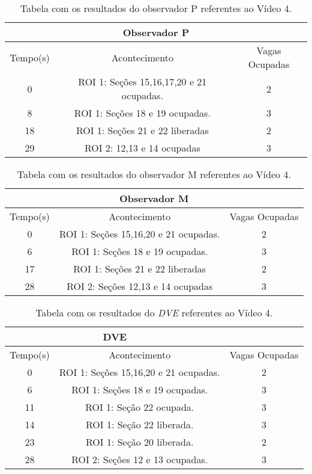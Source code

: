 \begin{table}[H]
\begin{center}
\begin{tabular}{|c||c||c|}
\hline
\multicolumn{3}{|c|}{Observador P}  \\ \hline \hline
Tempo(s) & Acontecimento & Vagas Ocupadas\\ \hline
0 & ROI 1: Seções 15,16,17,20 e 21 ocupadas. & 2 \\ \hline
8 & ROI 1: Seções 18 e 19 ocupadas. & 3 \\ \hline
18 & ROI 1: Seções 21 e 22 liberadas & 2 \\ \hline
29 & ROI 2: 12,13 e 14 ocupadas & 3 \\
\hline
\end{tabular}
\end{center}
\caption{Tabela com os resultados do observador P referentes ao Vídeo 4.}
\label{tab:video4P}
\end{table}

\begin{table}[H]
\begin{center}
\begin{tabular}{|c||c||c|}
\hline
\multicolumn{3}{|c|}{Observador M}  \\ \hline \hline
Tempo(s) & Acontecimento & Vagas Ocupadas\\ \hline
0 & ROI 1: Seções 15,16,20 e 21 ocupadas. & 2 \\ \hline
6 & ROI 1: Seções 18 e 19 ocupadas. & 3 \\ \hline
17 & ROI 1: Seções 21 e 22 liberadas & 2 \\ \hline
28 & ROI 2: Seções 12,13 e 14 ocupadas & 3 \\
\hline
\end{tabular}
\end{center}
\caption{Tabela com os resultados do observador M referentes ao Vídeo 4.}
\label{tab:video4M}
\end{table}

\begin{table}[H]
\begin{center}
\begin{tabular}{|c||c||c|}
\hline
\multicolumn{2}{|c|}{DVE}  \\ \hline \hline
Tempo(s) & Acontecimento & Vagas Ocupadas\\ \hline
0 & ROI 1: Seções 15,16,20 e 21 ocupadas. & 2 \\ \hline
6 & ROI 1: Seções 18 e 19 ocupadas. & 3 \\ \hline
11 & ROI 1: Seção 22 ocupada. & 3 \\ \hline
14 & ROI 1: Seção 22 liberada. & 3 \\ \hline
23 & ROI 1: Seção 20 liberada. & 2 \\ \hline
28 & ROI 2: Seções 12 e 13 ocupadas. & 3 \\
\hline
\end{tabular}
\end{center}
\caption{Tabela com os resultados do \textit{DVE} referentes ao Vídeo 4.}
\label{tab:video3}
\end{table}

